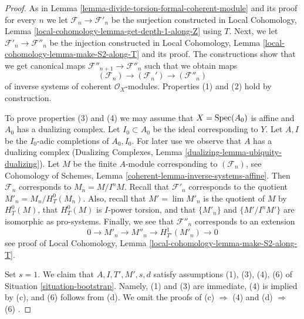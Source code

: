 \begin{proof}
As in Lemma \ref{lemma-divide-torsion-formal-coherent-module} and its proof
for every $n$ we let $\mathcal{F}_n \to \mathcal{F}'_n$ be the surjection
constructed in
Local Cohomology, Lemma \ref{local-cohomology-lemma-get-depth-1-along-Z}
using $T$.
Next, we let $\mathcal{F}'_n \to \mathcal{F}''_n$ be the injection
constructed in
Local Cohomology, Lemma \ref{local-cohomology-lemma-make-S2-along-T}
and its proof. The constructions show that we get canonical maps
$\mathcal{F}''_{n + 1} \to \mathcal{F}''_n$ such that we obtain
maps
$$
(\mathcal{F}_n) \longrightarrow (\mathcal{F}_n') \longrightarrow
(\mathcal{F}''_n)
$$
of inverse systems of coherent $\mathcal{O}_X$-modules.
Properties (1) and (2) hold by construction.

\medskip\noindent
To prove properties (3) and (4) we may assume that $X = \mathop{\mathrm{Spec}}(A_0)$ is
affine and $A_0$ has a dualizing complex. Let $I_0 \subset A_0$ be the
ideal corresponding to $Y$. Let $A, I$ be the $I_0$-adic completions of
$A_0, I_0$. For later use we observe that $A$ has a dualizing complex
(Dualizing Complexes, Lemma \ref{dualizing-lemma-ubiquity-dualizing}).
Let $M$ be the finite $A$-module corresponding to $(\mathcal{F}_n)$, see
Cohomology of Schemes, Lemma \ref{coherent-lemma-inverse-systems-affine}.
Then $\mathcal{F}_n$ corresponds to $M_n = M/I^nM$. Recall that
$\mathcal{F}'_n$ corresponds to the quotient $M'_n = M_n / H^0_T(M_n)$.
Also, recall that $M' = \lim M'_n$ is the quotient of $M$ by
$H^0_T(M)$, that $H^0_T(M)$ is $I$-power torsion, and that
$\{M'_n\}$ and $\{M'/I^nM'\}$ are isomorphic as pro-systems.
Finally, we see that $\mathcal{F}''_n$ corresponds to an extension
$$
0 \to M'_n \to M''_n \to H^1_{T'}(M'_n) \to 0
$$
see proof of
Local Cohomology, Lemma \ref{local-cohomology-lemma-make-S2-along-T}.

\medskip\noindent
Set $s = 1$. We claim that $A, I, T', M', s, d$ satisfy assumptions
(1), (3), (4), (6) of Situation \ref{situation-bootstrap}. Namely, (1) and (3)
are immediate, (4) is implied by (c), and (6) follows from (d).
We omit the proofs of (c) $\Rightarrow$ (4) and (d) $\Rightarrow$ (6) .


\end{proof}
